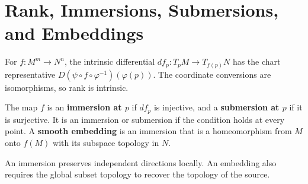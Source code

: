 \section{Rank, Immersions, Submersions, and Embeddings}
\label{sec:manifold-rank}
For $f:M^m\to N^n$, the intrinsic differential
$df_p:T_pM\to T_{f(p)}N$ has the chart representative
$D(\psi\circ f\circ\varphi^{-1})(\varphi(p))$.
The coordinate conversions are isomorphisms, so rank is intrinsic.
\begin{definition}\label{def:manifold-immersion-embedding}
The map $f$ is an \textbf{immersion at $p$} if $df_p$ is injective,
and a \textbf{submersion at $p$} if it is surjective. It is an immersion
or submersion if the condition holds at every point.
A \textbf{smooth embedding} is an immersion that is a homeomorphism
from $M$ onto $f(M)$ with its subspace topology in $N$.
\end{definition}
An immersion preserves independent directions locally. An embedding also
requires the global subset topology to recover the topology of the source.

